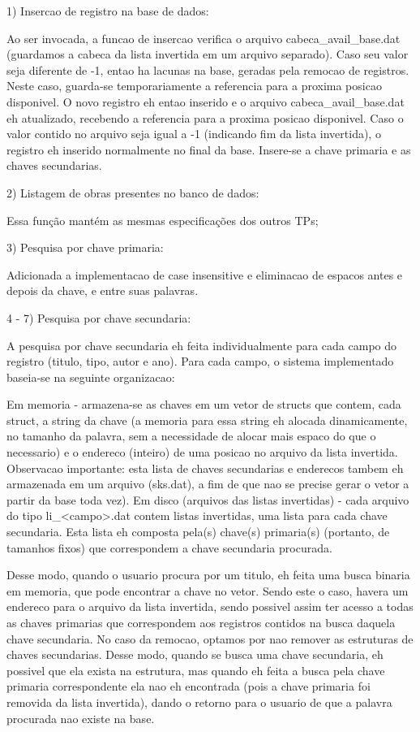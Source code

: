\documentclass{article}
\begin{document}
1) Insercao de registro na base de dados:

Ao ser invocada, a funcao de insercao verifica o arquivo cabeca_avail_base.dat (guardamos a cabeca da lista invertida em um arquivo separado). 
Caso seu valor seja diferente de -1, entao ha lacunas na base, geradas pela remocao de registros.
Neste caso, guarda-se temporariamente a referencia para a proxima posicao disponivel. O novo registro eh entao inserido e o arquivo cabeca_avail_base.dat eh atualizado, recebendo a referencia para a proxima posicao disponivel.
Caso o valor contido no arquivo seja igual a -1 (indicando fim da lista invertida), o registro eh inserido normalmente no final da base.
Insere-se a chave primaria e as chaves secundarias.



2) Listagem de obras presentes no banco de dados:

Essa função mantém as mesmas especificações dos outros TPs;



3) Pesquisa por chave primaria:

Adicionada a implementacao de case insensitive e eliminacao de espacos antes e depois da chave, e entre suas palavras.



4 - 7) Pesquisa por chave secundaria:

A pesquisa por chave secundaria eh feita individualmente para cada campo do registro (titulo, tipo, autor e ano). Para cada campo, o sistema implementado baseia-se na seguinte organizacao:

Em memoria - armazena-se as chaves em um vetor de structs que contem, cada struct, a string da chave (a memoria para essa string eh alocada dinamicamente, no tamanho da palavra, sem a necessidade de alocar mais espaco do que o necessario) e o endereco (inteiro) de uma posicao no arquivo da lista invertida. Observacao importante: esta lista de chaves secundarias e enderecos tambem eh armazenada em um arquivo (sks.dat), a fim de que nao se precise gerar o vetor a partir da base toda vez).
Em disco (arquivos das listas invertidas) - cada arquivo do tipo li_<campo>.dat contem listas invertidas, uma lista para cada chave secundaria. Esta lista eh composta pela(s) chave(s) primaria(s) (portanto, de tamanhos fixos) que correspondem a chave secundaria procurada.

Desse modo, quando o usuario procura por um titulo, eh feita uma busca binaria em memoria, que pode encontrar a chave no vetor. Sendo este o caso, havera um endereco para o arquivo da lista invertida, sendo possivel assim ter acesso a todas as chaves primarias que correspondem aos registros contidos na busca daquela chave secundaria.
No caso da remocao, optamos por nao remover as estruturas de chaves secundarias. Desse modo, quando se busca uma chave secundaria, eh possivel que ela exista na estrutura, mas quando eh feita a busca pela chave primaria correspondente ela nao eh encontrada (pois a chave primaria foi removida da lista invertida), dando o retorno para o usuario de que a palavra procurada nao existe na base.
\end{document}
